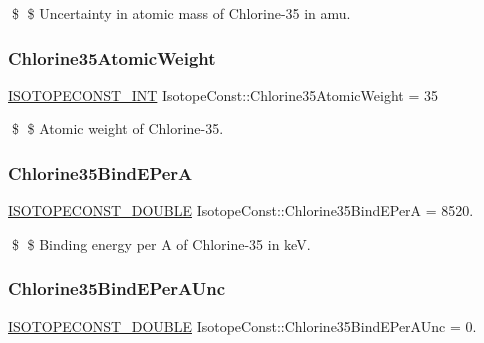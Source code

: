 \$ \$ Uncertainty in atomic mass of Chlorine-\/35 in amu. \mbox{\label{group___isotope_const-_chlorine-_cl35_ga99ab27db5f81f808dc7ca97e9651e31d}} 
\subsubsection{\texorpdfstring{Chlorine35\+Atomic\+Weight}{Chlorine35AtomicWeight}}
{\footnotesize\ttfamily \mbox{\hyperlink{group___isotope_const-_macros_ga5f18360b3e99483a35c32d789e62621c}{I\+S\+O\+T\+O\+P\+E\+C\+O\+N\+S\+T\+\_\+\+I\+NT}} Isotope\+Const\+::\+Chlorine35\+Atomic\+Weight = 35}

\$ \$ Atomic weight of Chlorine-\/35. \mbox{\label{group___isotope_const-_chlorine-_cl35_ga566a487b529ee0210f303a90db49320a}} 
\subsubsection{\texorpdfstring{Chlorine35\+Bind\+E\+PerA}{Chlorine35BindEPerA}}
{\footnotesize\ttfamily \mbox{\hyperlink{group___isotope_const-_macros_ga8f45a7272ce02c0b4c65c44636ed719a}{I\+S\+O\+T\+O\+P\+E\+C\+O\+N\+S\+T\+\_\+\+D\+O\+U\+B\+LE}} Isotope\+Const\+::\+Chlorine35\+Bind\+E\+PerA = 8520.}

\$ \$ Binding energy per A of Chlorine-\/35 in keV. \mbox{\label{group___isotope_const-_chlorine-_cl35_ga9928c6ddb52c4f19bf2f0f729adaa6e0}} 
\subsubsection{\texorpdfstring{Chlorine35\+Bind\+E\+Per\+A\+Unc}{Chlorine35BindEPerAUnc}}
{\footnotesize\ttfamily \mbox{\hyperlink{group___isotope_const-_macros_ga8f45a7272ce02c0b4c65c44636ed719a}{I\+S\+O\+T\+O\+P\+E\+C\+O\+N\+S\+T\+\_\+\+D\+O\+U\+B\+LE}} Isotope\+Const\+::\+Chlorine35\+Bind\+E\+Per\+A\+Unc = 0.}

